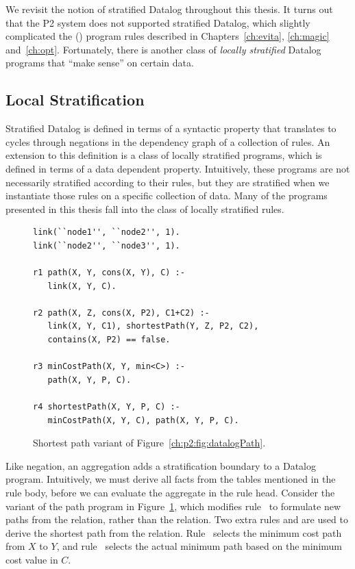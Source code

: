 We revisit the notion of stratified Datalog throughout this thesis.  It turns
out that the P2 system does not supported stratified Datalog, which slightly
complicated the (\OVERLOG) program rules described in Chapters~\ref{ch:evita},
\ref{ch:magic} and~\ref{ch:opt}.  Fortunately, there is another class of {\em
locally stratified} Datalog programs that ``make sense'' on certain data.

\subsection{Local Stratification}

Stratified Datalog is defined in terms of a syntactic property that translates
to cycles through negations in the dependency graph of a collection of rules.
An extension to this definition is a class of locally stratified programs,
which is defined in terms of a data dependent property.  Intuitively, these
programs are not necessarily stratified according to their rules, but they are
stratified when we instantiate those rules on a specific collection of data.
Many of the programs presented in this thesis fall into the class of locally
stratified rules.

\begin{figure}
\ssp
\begin{lstlisting}
link(``node1'', ``node2'', 1).
link(``node2'', ``node3'', 1).

r1 path(X, Y, cons(X, Y), C) :-
   link(X, Y, C).

r2 path(X, Z, cons(X, P2), C1+C2) :-
   link(X, Y, C1), shortestPath(Y, Z, P2, C2),
   contains(X, P2) == false.

r3 minCostPath(X, Y, min<C>) :-
   path(X, Y, P, C).

r4 shortestPath(X, Y, P, C) :-
   minCostPath(X, Y, C), path(X, Y, P, C).

\end{lstlisting}
\caption{\label{ch:p2:fig:datalogSP}Shortest path variant of Figure~\ref{ch:p2:fig:datalogPath}.}
\end{figure}

Like negation, an aggregation adds a stratification boundary to a Datalog
program.  Intuitively, we must derive all facts from the tables mentioned in
the rule body, before we can evaluate the aggregate in the rule head.
Consider the variant of the path program in Figure~\ref{ch:p2:fig:datalogSP},
which modifies rule~ to formulate new paths from the 
relation, rather than the  relation.  Two extra rules  and
 are used to derive the shortest path from the  relation.
Rule~ selects the minimum cost path from $X$ to $Y$, and rule~
selects the actual minimum path based on the minimum cost value in $C$.

